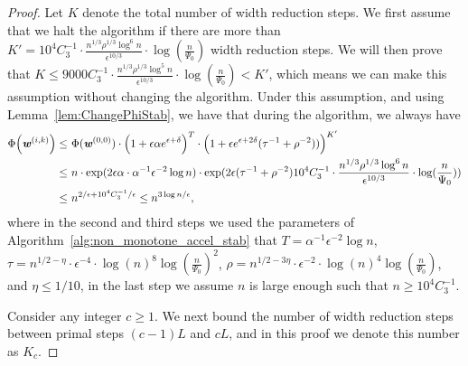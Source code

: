 \documentclass[11pt]{article}
\let\originalleft\left
\let\originalright\right
\renewcommand{\left}{\mathopen{}\mathclose\bgroup\originalleft}
\renewcommand{\right}{\aftergroup\egroup\originalright}
\newcommand\ww{\boldsymbol{\mathit{w}}}
\begin{document}
\begin{proof}
Let $K$ denote the total number of width reduction steps. We first assume that we halt the algorithm if there are more than $K' = 10^4 C_3^{-1} \cdot \frac{n^{1/3} \rho^{1/3} \log^6 n}{\epsilon^{10/3}} \cdot \log(\frac{n}{\Psi_0})$ width reduction steps. We will then prove that $K \leq 9000 C_3^{-1} \cdot \frac{n^{1/3} \rho^{1/3} \log^5 n}{\epsilon^{10/3}} \cdot \log(\frac{n}{\Psi_0}) < K'$, which means we can make this assumption without changing the algorithm. Under this assumption, and using Lemma~\ref{lem:ChangePhiStab}, we have that during the algorithm, we always have
\begin{align}\label{eq:upper_bound_Phi}
\Phi\left(\ww^{(i,k)}\right) \leq &~ \Phi(\ww^{(0,0)}) \cdot \left(1+\epsilon\alpha e^{\epsilon+\delta} \right)^T \cdot \left( 1 + \epsilon e^{\epsilon+2\delta} (\tau^{-1} + \rho^{-2})) \right)^{K'} \notag \\
\leq &~ n \cdot \exp(2 \epsilon\alpha \cdot \alpha^{-1} \epsilon^{-2} \log n) \cdot \exp(2 \epsilon (\tau^{-1} + \rho^{-2}) 10^4 C_3^{-1} \cdot \frac{n^{1/3} \rho^{1/3} \log^6 n}{\epsilon^{10/3}} \cdot \log(\frac{n}{\Psi_0})) \notag \\
\leq &~ n^{2 /\epsilon + 10^4 C_3^{-1}/\epsilon} \leq n^{3 \log n / \epsilon}, 
\end{align}
where in the second and third steps we used the parameters of Algorithm~\ref{alg:non_monotone_accel_stab} that $T = \alpha^{-1} \epsilon^{-2} \log n$, $\tau = n^{1/2-\eta} \cdot \epsilon^{-4} \cdot \log(n)^8 \log(\frac{n}{\Psi_0})^2$, $\rho = n^{1/2-3\eta} \cdot \epsilon^{-2} \cdot \log(n)^4 \log(\frac{n}{\Psi_0})$, and $\eta \leq 1/10$, in the last step we assume $n$ is large enough such that $n \geq 10^4 C_3^{-1}$.



Consider any integer $c \geq 1$. We next bound the number of width reduction steps between primal steps $(c-1)L$ and $cL$, and in this proof we denote this number as $K_c$.


\end{proof}
\end{document}
